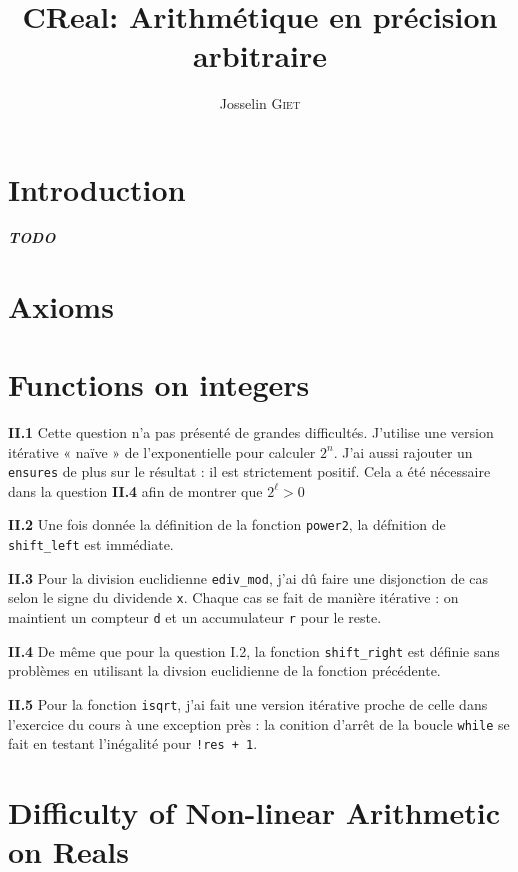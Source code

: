 \documentclass[9pt,a4paper,twocolumn]{article}
\title{CReal: Arithmétique en précision arbitraire}   %
\author{Josselin \textsc{Giet}}  %
\theoremstyle{definition}
\newcommand{\TODO}{{\color{red}\textbf{\textit{TODO}}}}
\begin{document}
\maketitle

\section*{Introduction}
\TODO

\section{Axioms}

\section{Functions on integers}

\textbf{II.1}
Cette question n'a pas présenté de grandes difficultés.
J'utilise une version itérative « naïve » de l'exponentielle pour
calculer $2^n$.
J'ai aussi rajouter un \texttt{ensures} de plus sur le résultat : 
il est strictement positif.
Cela a été nécessaire dans la question \textbf{II.4} afin de montrer que 
$2^\ell > 0$

\textbf{II.2}
Une fois donnée la définition de la fonction \texttt{power2}, la défnition de
\texttt{shift\_left} est immédiate.

\textbf{II.3}
Pour la division euclidienne \texttt{ediv\_mod}, j'ai dû faire une disjonction
de cas selon le signe du dividende \texttt{x}.
Chaque cas se fait de manière itérative : on maintient un compteur \texttt{d}
et un accumulateur \texttt{r} pour le reste.

\textbf{II.4}
De même que pour la question I.2, la fonction \texttt{shift\_right} est définie
sans problèmes en utilisant la divsion euclidienne de la fonction 
précédente.

\textbf{II.5}
Pour la fonction \texttt{isqrt}, j'ai fait une version itérative proche de 
celle dans l'exercice du cours à une exception près : la conition d'arrêt de 
la boucle \texttt{while} se fait en testant l'inégalité pour \texttt{!res + 1}.

\section{Difficulty of Non-linear Arithmetic on Reals}
\end{document}

